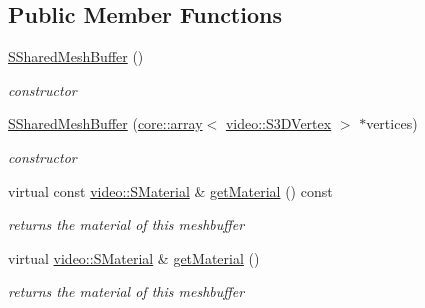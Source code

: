 \subsection*{Public Member Functions}
\begin{DoxyCompactItemize}
\item 
\mbox{\label{structirr_1_1scene_1_1SSharedMeshBuffer_a9d122d688d0823345807cf9ef0efb952}} 
\hyperlink{structirr_1_1scene_1_1SSharedMeshBuffer_a9d122d688d0823345807cf9ef0efb952}{S\+Shared\+Mesh\+Buffer} ()
\begin{DoxyCompactList}\small\item\em constructor \end{DoxyCompactList}\item 
\mbox{\label{structirr_1_1scene_1_1SSharedMeshBuffer_ac6bc32830ae182696d3063a972762bec}} 
\hyperlink{structirr_1_1scene_1_1SSharedMeshBuffer_ac6bc32830ae182696d3063a972762bec}{S\+Shared\+Mesh\+Buffer} (\hyperlink{classirr_1_1core_1_1array}{core\+::array}$<$ \hyperlink{structirr_1_1video_1_1S3DVertex}{video\+::\+S3\+D\+Vertex} $>$ $\ast$vertices)
\begin{DoxyCompactList}\small\item\em constructor \end{DoxyCompactList}\item 
\mbox{\label{structirr_1_1scene_1_1SSharedMeshBuffer_aea6a55293929329800d6299f86b65841}} 
virtual const \hyperlink{classirr_1_1video_1_1SMaterial}{video\+::\+S\+Material} \& \hyperlink{structirr_1_1scene_1_1SSharedMeshBuffer_aea6a55293929329800d6299f86b65841}{get\+Material} () const
\begin{DoxyCompactList}\small\item\em returns the material of this meshbuffer \end{DoxyCompactList}\item 
\mbox{\label{structirr_1_1scene_1_1SSharedMeshBuffer_ac1dcea2247c8f63adc4a5935ce39bcbc}} 
virtual \hyperlink{classirr_1_1video_1_1SMaterial}{video\+::\+S\+Material} \& \hyperlink{structirr_1_1scene_1_1SSharedMeshBuffer_ac1dcea2247c8f63adc4a5935ce39bcbc}{get\+Material} ()
\begin{DoxyCompactList}\small\item\em returns the material of this meshbuffer \end{DoxyCompactList}\item 

\end{DoxyCompactItemize}
